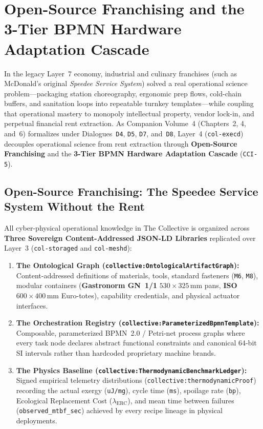 \section{Open-Source Franchising and the 3-Tier BPMN Hardware Adaptation Cascade}
\label{sec:l4-franchising-cascade}

In the legacy Layer~7 economy, industrial and culinary franchises (such as McDonald's original \textit{Speedee Service System}) solved a real operational science problem---packaging station choreography, ergonomic prep flows, cold-chain buffers, and sanitation loops into repeatable turnkey templates---while coupling that operational mastery to monopoly intellectual property, vendor lock-in, and perpetual financial rent extraction. As Companion Volume~4 (Chapters~2, 4, and~6) formalizes under Dialogues~\texttt{D4}, \texttt{D5}, \texttt{D7}, and~\texttt{D8}, Layer~4 (\texttt{col-execd}) decouples operational science from rent extraction through \textbf{Open-Source Franchising} and the \textbf{3-Tier BPMN Hardware Adaptation Cascade} (\texttt{CCI-5}).

\subsection{Open-Source Franchising: The Speedee Service System Without the Rent}

All cyber-physical operational knowledge in The Collective is organized across \textbf{Three Sovereign Content-Addressed JSON-LD Libraries} replicated over Layer~3 (\texttt{col-storaged} and \texttt{col-meshd}):
\begin{enumerate}
  \item \textbf{The Ontological Graph (\texttt{collective:OntologicalArtifactGraph}):} Content-addressed definitions of materials, tools, standard fasteners (\texttt{M6}, \texttt{M8}), modular containers (\textbf{Gastronorm GN~1/1} $530 \times 325\,\mathrm{mm}$ pans, \textbf{ISO $600 \times 400\,\mathrm{mm}$} Euro-totes), capability credentials, and physical actuator interfaces.
  \item \textbf{The Orchestration Registry (\texttt{collective:ParameterizedBpmnTemplate}):} Composable, parameterized BPMN~2.0 / Petri-net process graphs where every task node declares abstract functional constraints and canonical 64-bit SI intervals rather than hardcoded proprietary machine brands.
  \item \textbf{The Physics Baseline (\texttt{collective:ThermodynamicBenchmarkLedger}):} Signed empirical telemetry distributions (\texttt{collective:thermodynamicProof}) recording the actual exergy (\texttt{uJ/mg}), cycle time (\texttt{ms}), spoilage rate (\texttt{bp}), Ecological Replacement Cost ($\lambda_{\mathrm{ERC}}$), and mean time between failures (\texttt{observed\_mtbf\_sec}) achieved by every recipe lineage in physical deployments.
\end{enumerate}

